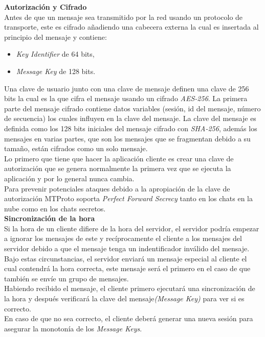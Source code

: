 \textbf{Autorización y Cifrado}\\
			Antes de que un mensaje sea transmitido por la red usando un protocolo de transporte, este es cifrado añadiendo una cabecera externa la cual es insertada al principio del mensaje y contiene:
	\begin{itemize}
		\item \emph{Key Identifier} de 64 bits,
		\item \emph{Message Key} de 128 bits.
	\end{itemize}
Una clave de usuario junto con una clave de mensaje definen una clave de 256 bits la cual es la que cifra el mensaje usando un cifrado \emph{AES-256}.
La primera parte del mensaje cifrado contiene datos variables (sesión, id del mensaje, número de secuencia) los cuales influyen en la clave del mensaje. La clave del mensaje es definida como los 128 bits iniciales del mensaje cifrado con \emph{SHA-256}, 
además los mensajes en varias partes, que son los mensajes que se fragmentan debido a su tamaño, están cifrados como un solo mensaje.\\
Lo primero que tiene que hacer la aplicación cliente es crear una clave de autorización que se genera normalmente la primera vez que se ejecuta la aplicación y por lo general nunca cambia.\\
Para prevenir potenciales ataques debido a la apropiación de la clave de autorización MTProto soporta \emph{Perfect Forward Secrecy} tanto en los chats en la nube como en los chats secretos.\\

\textbf{Sincronización de la hora}\\
Si la hora de un cliente difiere de la hora del servidor, el servidor podría empezar a ignorar los mensajes de este y recíprocamente el cliente a los mensajes del servidor debido a que el mensaje tenga un indentificador inválido del mensaje.\\
Bajo estas circunstancias, el servidor enviará un mensaje especial al cliente el cual contendrá la hora correcta, este mensaje será el primero en el caso de que también se envíe un grupo de mensajes.\\
Habiendo recibido el mensaje, el cliente primero ejecutará una sincronización de la hora y después verificará la clave del mensaje\emph{(Message Key)} para ver si es correcto.\\
En caso de que no sea correcto, el cliente deberá generar una nueva sesión para asegurar la monotonía de los \emph{Message Keys}.

